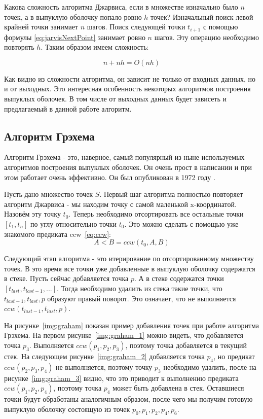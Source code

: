 Какова сложность алгоритма Джарвиса, если в множестве изначально было $n$ точек, а в выпуклую оболочку попало ровно $h$ точек? Изначальный поиск левой крайней точки занимает $n$ шагов. Поиск следующей точки $t_{i+1}$ с помощью формулы \eqref{eq:jarvisNextPoint} занимает ровно $n$ шагов. Эту операцию необходимо повторять $h$. Таким образом имеем сложность:

\[
n+ nh = O(nh)
\]

Как видно из сложности алгоритма, он зависит не только от входных данных, но и от выходных. Это интересная особенность некоторых алгоритмов построения выпуклых оболочек. В том числе от выходных данных будет зависеть и предлагаемый в данной работе алгоритм.

\subsection{Алгоритм Грэхема} \label{subsect1_1_2}

Алгоритм Грэхема - это, наверное, самый популярный из ныне используемых алгоритмов построения выпуклых оболочек. Он очень прост в написании и при этом работает очень эффективно. Он был опубликован в 1972 году \cite{graham1972GrahamScan}.

Пусть дано множество точек $S$. Первый шаг алгоритма полностью повторяет алгоритм Джарвиса - мы находим точку с самой маленькой x-координатой. Назовём эту точку $t_0$. Теперь необходимо отсортировать все остальные точки $[t_1, t_n]$ по углу относительно точки $t_0$. Это можно сделать с помощью уже знакомого предиката ccw~\eqref{eq:ccw}:
\[
A<B=ccw(t_0, A, B)
\]

Следующий этап алгоритма - это итерирование по отсортированному множеству точек. В это время все точки уже добавленные в выпуклую оболочку содержатся в стеке. Пусть сейчас добавляется точка $p$. А в стеке содержатся точки $[t_{last}, t_{last-1}, ...]$. Тогда необходимо удалить из стека такие точки, что $t_{last-1}, t_{last}, p$ образуют правый поворот. Это означает, что не выполняется $ccw(t_{last-1}, t_{last}, p)$.

На рисунке~\ref{img:graham} показан пример добавления точек при работе алгоритма Грэхема. На первом рисунке~\ref{img:graham_1} можно видеть, что добавляется точка $p_3$. Выполняется $ccw(p_1, p_2, p_3)$, поэтому точка добавляется в текущий стек. На следующем рисунке~\ref{img:graham_2} добавляется точка $p_4$, но предикат $ccw(p_2, p_3, p_4)$ не выполняется, поэтому точку $p_3$ необходимо удалить, после на рисунке~\ref{img:graham_3} видно, что это приводит к выполнению предиката $ccw(p_1, p_2, p_4)$, поэтому точка $p_4$ может быть добавлена в стек. Оставшиеся точки будут обработаны аналогичным образом, после чего мы получим готовую выпуклую оболочку состоящую из точек $p_0, p_1, p_2, p_4, p_6$.

